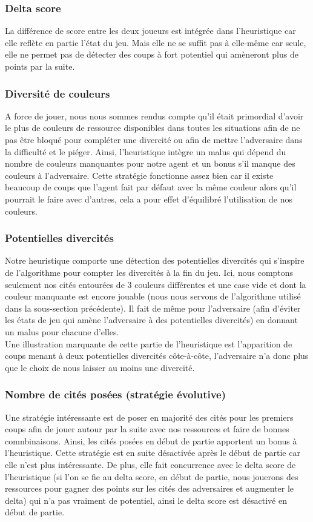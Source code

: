 \documentclass[a4paper,11pt,titlepage,leqno]{article}
\begin{document}
\subsubsection{Delta score}
La différence de score entre les deux joueurs est intégrée dans l'heuristique car elle reflète en partie l'état du jeu. Mais elle ne se suffit pas à elle-même car seule, elle ne permet pas de détecter des coups à fort potentiel qui amèneront plus de points par la suite.

\subsubsection{Diversité de couleurs}
A force de jouer, nous nous sommes rendus compte qu'il était primordial d'avoir le plus de couleurs  de ressource disponibles dans toutes les situations afin de ne pas être bloqué pour compléter une divercité ou afin de mettre l'adversaire dans la difficulté et le piéger. Ainsi, l'heuristique intègre un malus qui dépend du nombre de couleurs manquantes pour notre agent et un bonus s'il manque des couleurs à l'adversaire. Cette stratégie fonctionne assez bien car il existe beaucoup de coups que l'agent fait par défaut avec la même couleur alors qu'il pourrait le faire avec d'autres, cela a pour effet d'équilibré l'utilisation de nos couleurs.

\subsubsection{Potentielles divercités}
Notre heuristique comporte une détection des potentielles divercités qui s'inspire de l'algorithme pour compter les divercités à la fin du jeu. Ici, nous comptons seulement nos cités entourées de 3 couleurs différentes et une case vide et dont la couleur manquante est encore jouable (nous nous servons de l'algorithme utilisé dans la sous-section précédente). Il fait de même pour l'adversaire (afin d'éviter les états de jeu qui amène l'adversaire à des potentielles divercités) en donnant un malus pour chacune d'elles. \\
Une illustration marquante de cette partie de l'heuristique est l'apparition de coups menant à deux potentielles divercités côte-à-côte, l'adversaire n'a donc plus que le choix de nous laisser au moins une divercité.

\subsubsection{Nombre de cités posées (stratégie évolutive)}
Une stratégie intéressante est de poser en majorité des cités pour les premiers coups afin de jouer autour par la suite avec nos ressources et faire de bonnes comnbinaisons. Ainsi, les cités posées en début de partie apportent un bonus à l'heuristique. Cette stratégie est en suite désactivée après le début de partie car elle n'est plus intéressante. De plus, elle fait concurrence avec le delta score de l'heuristique (si l'on se fie au delta score, en début de partie, nous jouerons des ressources pour gagner des points sur les cités des adversaires et augmenter le delta) qui n'a pas vraiment de potentiel, ainsi le delta score est désactivé en début de partie.
\end{document}
